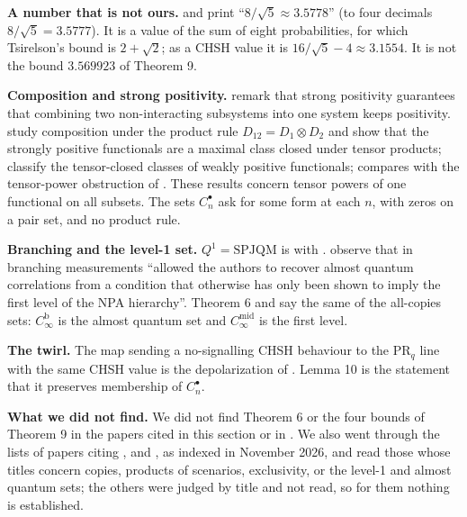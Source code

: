 \documentclass[11pt,a4paper]{article}
\theoremstyle{definition}
\theoremstyle{remark}
\newcommand{\PR}{\mathrm{PR}}
\newcommand{\SPJQM}{\mathrm{SPJQM}}
\newcommand{\md}{\mathrm{mid}}
\newcommand{\br}{\mathrm{b}}
\newcommand{\ps}{\bullet}
\begin{document}
\medskip
\noindent\textbf{A number that is not ours.} \cite{C13} and \cite{Y13} print ``$8/\sqrt{5} \approx 3.5778$'' (to four decimals $8/\sqrt{5} = 3.5777$). It is a value of the sum of eight probabilities, for which Tsirelson's bound is $2 + \sqrt{2}$; as a CHSH value it is $16/\sqrt{5} - 4 \approx 3.1554$. It is not the bound $3.569923$ of Theorem 9.

\medskip
\noindent\textbf{Composition and strong positivity.} \cite{MOS} remark that strong positivity guarantees that combining two non-interacting subsystems into one system keeps positivity. \cite{BN} study composition under the product rule $D_{12} = D_1 \otimes D_2$ and show that the strongly positive functionals are a maximal class closed under tensor products; \cite{DW} classify the tensor-closed classes of weakly positive functionals; \cite[Remark 9]{R7} compares \cite{DW} with the tensor-power obstruction of \cite[Corollary 8]{R7}. These results concern tensor powers of one functional on all subsets. The sets $C_n^{\ps}$ ask for some form at each $n$, with zeros on a pair set, and no product rule.

\medskip
\noindent\textbf{Branching and the level-1 set.} $Q^1 = \SPJQM$ is \cite[Theorem 15]{DHW} with \cite[Theorem 3.2]{SP}. \cite{HS} observe that in \cite{DHW} branching measurements ``allowed the authors to recover almost quantum correlations from a condition that otherwise has only been shown to imply the first level of the NPA hierarchy''. Theorem 6 and \cite{R7} say the same of the all-copies sets: $C_\infty^{\br}$ is the almost quantum set and $C_\infty^{\md}$ is the first level.

\medskip
\noindent\textbf{The twirl.} The map sending a no-signalling CHSH behaviour to the $\PR_q$ line with the same CHSH value is the depolarization of \cite[Appendix A]{MAG}. Lemma 10 is the statement that it preserves membership of $C_n^{\ps}$.

\medskip
\noindent\textbf{What we did not find.} We did not find Theorem 6 or the four bounds of Theorem 9 in the papers cited in this section or in \cite{DS}. We also went through the lists of papers citing \cite{DHW}, \cite{SFA+} and \cite{BN}, as indexed in November 2026, and read those whose titles concern copies, products of scenarios, exclusivity, or the level-1 and almost quantum sets; the others were judged by title and not read, so for them nothing is established.
\end{document}
